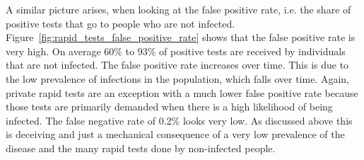 \FloatBarrier

A similar picture arises, when looking at the false positive rate,
i.e. the share of positive tests that go to people who are not infected.
Figure~\ref{fig:rapid_tests_false_positive_rate} shows that the false
positive rate is very high. On average 60\% to 93\% of positive tests are
received by individuals that are not infected. The false positive rate increases over
time. This is due to the low prevalence of infections in the population, which falls
over time. Again, private rapid tests are an exception with a much lower false
positive rate because those tests are primarily demanded when there is a high likelihood
of being infected. The false negative rate of 0.2\% looks very low. As discussed
above this is deceiving and just a mechanical consequence of a very low prevalence
of the disease and the many rapid tests done by non-infected people.

